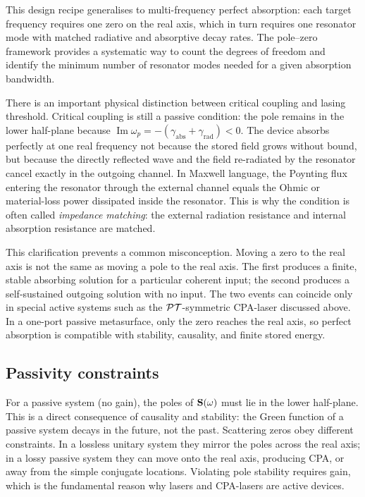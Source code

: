 This design recipe generalises to multi-frequency perfect absorption:
each target frequency requires one zero on the real axis, which in turn
requires one resonator mode with matched radiative and absorptive
decay rates. The pole--zero framework provides a systematic way to
count the degrees of freedom and identify the minimum number of
resonator modes needed for a given absorption bandwidth.

There is an important physical distinction between critical coupling and
lasing threshold. Critical coupling is still a passive condition: the
pole remains in the lower half-plane because
$\operatorname{Im}\omega_p=-(\gamma_{\mathrm{abs}}+
\gamma_{\mathrm{rad}})<0$. The device absorbs perfectly at one real
frequency not because the stored field grows without bound, but because
the directly reflected wave and the field re-radiated by the resonator
cancel exactly in the outgoing channel. In Maxwell language, the
Poynting flux entering the resonator through the external channel equals
the Ohmic or material-loss power dissipated inside the resonator. This
is why the condition is often called \emph{impedance matching}: the
external radiation resistance and internal absorption resistance are
matched.

This clarification prevents a common misconception. Moving a zero to
the real axis is not the same as moving a pole to the real axis. The
first produces a finite, stable absorbing solution for a particular
coherent input; the second produces a self-sustained outgoing solution
with no input. The two events can coincide only in special active
systems such as the $\mathcal{PT}$-symmetric CPA-laser discussed above. In a
one-port passive metasurface, only the zero reaches the real axis, so
perfect absorption is compatible with stability, causality, and finite
stored energy.

\subsection{Passivity constraints}
\label{ssec:passivity-poles}

For a passive system (no gain), the poles of $\mathbf{S}(\omega)$ must lie in
the lower half-plane. This is a direct consequence of causality and
stability: the Green function of a passive system decays in the future,
not the past. Scattering zeros obey different constraints. In a lossless
unitary system they mirror the poles across the real axis; in a lossy
passive system they can move onto the real axis, producing CPA, or away
from the simple conjugate locations. Violating pole stability requires
gain, which is the fundamental reason why lasers and CPA-lasers are
active devices.

